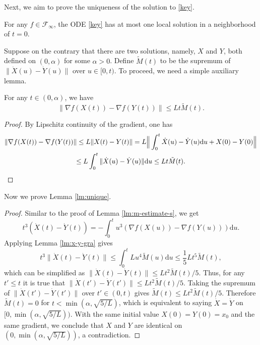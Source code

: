 \documentclass[twoside,11pt]{article}
\newcommand{\der}[1]{\dot #1}
\newcommand{\norm}[1]{\|#1\|}
\newcommand{\inverse}[1]{\frac{1}{#1}}
\renewcommand{\d}{{\mathrm{d}}}
\begin{document}
Next, we aim to prove the uniqueness of the solution to \eqref{key}.
\begin{lemma}\label{lm:unique}
For any $f \in \mathcal{F}_{\infty}$, the ODE \eqref{key} has at most one local solution in a neighborhood of $t=0$.
\end{lemma}
Suppose on the contrary that there are two solutions, namely, $X$ and $Y$, both defined on $(0, \alpha)$ for some $\alpha > 0$. Define $\tilde M(t)$ to be the supremum of $\norm{\der{X}(u) - \der{Y}(u)}$ over $u\in [0, t)$. To proceed, we need a simple auxiliary lemma.
\begin{lemma}\label{lm:x-y-gra}
For any $t\in (0, \alpha)$, we have
\begin{equation}\nonumber
\norm{\nabla f(X(t)) - \nabla f(Y(t))} \le Lt\tilde M(t).
\end{equation}
\end{lemma}
\begin{proof}
By Lipschitz continuity of the gradient, one has
\begin{multline}\nonumber
\norm{\nabla f(X(t)) - \nabla f(Y(t))} \le L\norm{X(t) - Y(t)} = L\Big{\|}\int_{0}^t\der{X}(u) - \der{Y}(u)\d u + X(0)-Y(0)\Big{\|}\\\le L\int_{0}^t\norm{\der{X}(u) - \der{Y}(u)}\d u\le Lt\tilde M(t).
\end{multline}
\end{proof}

Now we prove Lemma \ref{lm:unique}.
\begin{proof}
Similar to the proof of Lemma \ref{lm:m-estimate-s}, we get
\begin{equation}\nonumber
t^3(\der{X}(t) - \der{Y}(t)) = -\int^t_{0}u^3(\nabla f(X(u)) - \nabla f(Y(u)))\d u.
\end{equation}
Applying Lemma \ref{lm:x-y-gra} gives
\begin{equation}\nonumber
t^3{\norm{\der{X}(t) - \der{Y}(t)}} \le\int^t_0Lu^4\tilde M(u)\d u \le \inverse{5}Lt^5\tilde M(t),
\end{equation}
which can be simplified as ${\norm{\der{X}(t) - \der{Y}(t)}}\le Lt^2\tilde M(t)/5$. Thus, for any $t'\le t$ it is true that ${\norm{\der{X}(t') - \der{Y}(t')}}\le Lt^2\tilde M(t)/5$. Taking the supremum of ${\norm{\der{X}(t') - \der{Y}(t')}}$ over $t'\in (0, t)$ gives $\tilde M(t)\le Lt^2\tilde M(t)/5$. Therefore $\tilde M(t)=0$ for $t < \min(\alpha, \sqrt{5/L})$, which is equivalent to saying $\der{X} = \der{Y}$ on $[0, \min(\alpha, \sqrt{5/L}))$. With the same initial value $X(0) = Y(0) = x_0$ and the same gradient, we conclude that $X$ and $Y$ are identical on $(0, \min(\alpha, \sqrt{5/L}))$, a contradiction.
\end{proof}
\end{document}
